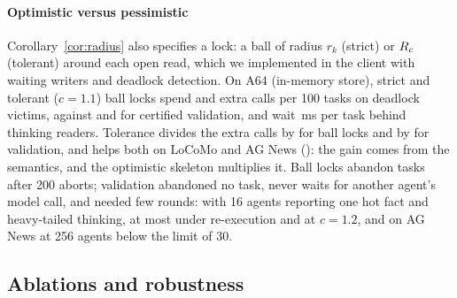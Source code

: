 \documentclass[sigconf, nonacm, review]{acmart}
\begin{document}
\paragraph{Optimistic versus pessimistic}
Corollary~\ref{cor:radius} also specifies a lock: a ball of radius
$r_k$ (strict) or $R_c$ (tolerant) around each open read, which we
implemented in the client with waiting writers and deadlock detection.
On A64 (in-memory store), strict and tolerant ($c=1.1$) ball locks
spend  and  extra
calls per 100 tasks on deadlock victims, against
 and  for certified
validation, and wait \,ms per task behind
thinking readers. Tolerance divides the extra calls by
 for ball locks and by  for
validation, and helps both on LoCoMo and AG News
(\appExp): the gain comes from the semantics, and the optimistic
skeleton multiplies it. Ball locks abandon tasks after 200
aborts; validation abandoned no task, never waits for another agent's model
call, and needed few rounds: with 16 agents reporting one hot fact
and heavy-tailed thinking, at most
 under re-execution and
 at $c=1.2$, and on AG News at 256
agents below the limit of 30.

\subsection{Ablations and robustness}
\label{sec:eval-abl}
\end{document}
